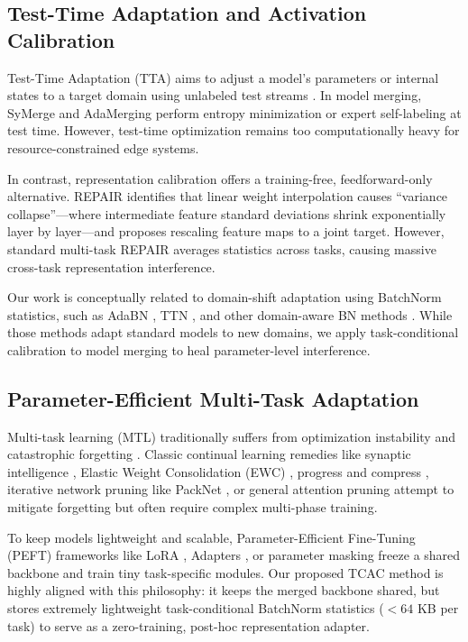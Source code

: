 \documentclass{article}
\theoremstyle{plain}
\theoremstyle{definition}
\theoremstyle{remark}
\begin{document}
\subsection{Test-Time Adaptation and Activation Calibration}
Test-Time Adaptation (TTA) aims to adjust a model's parameters or internal states to a target domain using unlabeled test streams \cite{wang2020tent, zhang2022memo, wang2022continual}. In model merging, SyMerge \cite{jung2025symerge} and AdaMerging \cite{yang2024adamerging} perform entropy minimization or expert self-labeling at test time. However, test-time optimization remains too computationally heavy for resource-constrained edge systems.

In contrast, representation calibration offers a training-free, feedforward-only alternative. REPAIR \cite{jordan2022repair} identifies that linear weight interpolation causes ``variance collapse''---where intermediate feature standard deviations shrink exponentially layer by layer---and proposes rescaling feature maps to a joint target. However, standard multi-task REPAIR averages statistics across tasks, causing massive cross-task representation interference.

Our work is conceptually related to domain-shift adaptation using BatchNorm statistics, such as AdaBN \cite{li2016revisiting}, TTN \cite{song2023test}, and other domain-aware BN methods \cite{lim2023test}. While those methods adapt standard models to new domains, we apply task-conditional calibration to model merging to heal parameter-level interference.

\subsection{Parameter-Efficient Multi-Task Adaptation}
Multi-task learning (MTL) traditionally suffers from optimization instability and catastrophic forgetting \cite{caruana1997multitask, kirkpatrick2017overcoming, buzzega2020dark}. Classic continual learning remedies like synaptic intelligence \cite{zenke2017continual}, Elastic Weight Consolidation (EWC) \cite{kirkpatrick2017overcoming}, progress and compress \cite{schwarz2018progress}, iterative network pruning like PackNet \cite{mallya2018packnet}, or general attention pruning \cite{serrano2019is} attempt to mitigate forgetting but often require complex multi-phase training.

To keep models lightweight and scalable, Parameter-Efficient Fine-Tuning (PEFT) frameworks like LoRA \cite{hu2021lora}, Adapters \cite{houlsby2019parameter}, or parameter masking \cite{pmlr-v119-zhao20b} freeze a shared backbone and train tiny task-specific modules. Our proposed TCAC method is highly aligned with this philosophy: it keeps the merged backbone shared, but stores extremely lightweight task-conditional BatchNorm statistics ($<64$ KB per task) to serve as a zero-training, post-hoc representation adapter.
\end{document}

